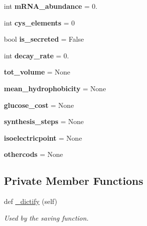 \begin{DoxyCompactItemize}
int {\bfseries m\+R\+N\+A\+\_\+abundance} = 0.
\item 
\mbox{\label{class_py_c_u_b_1_1homology_1_1homology_a5492c796d1e811df903eb6ac5e6c5873}} 
int {\bfseries cys\+\_\+elements} = 0
\item 
\mbox{\label{class_py_c_u_b_1_1homology_1_1homology_a0db815d3136df0d8057d6aa207e3a9d7}} 
bool {\bfseries is\+\_\+secreted} = False
\item 
\mbox{\label{class_py_c_u_b_1_1homology_1_1homology_a86cb7804faa6ffae20b7155897d88971}} 
int {\bfseries decay\+\_\+rate} = 0.
\item 
\mbox{\label{class_py_c_u_b_1_1homology_1_1homology_a7b73b4cd404f7432302ce682970c04c1}} 
{\bfseries tot\+\_\+volume} = None
\item 
\mbox{\label{class_py_c_u_b_1_1homology_1_1homology_a2fcdeaac4c8dcda15c2faaa26d565c2b}} 
{\bfseries mean\+\_\+hydrophobicity} = None
\item 
\mbox{\label{class_py_c_u_b_1_1homology_1_1homology_a3935ee71c6588e71ed71ca843dabb275}} 
{\bfseries glucose\+\_\+cost} = None
\item 
\mbox{\label{class_py_c_u_b_1_1homology_1_1homology_af6987d4b9223fb55cfe60e0456478b71}} 
{\bfseries synthesis\+\_\+steps} = None
\item 
\mbox{\label{class_py_c_u_b_1_1homology_1_1homology_ab3cc7d820ffac1600aea6dbc58995364}} 
{\bfseries isoelectricpoint} = None
\item 
\mbox{\label{class_py_c_u_b_1_1homology_1_1homology_a0fee75b305ed6adb93ed111cce23218a}} 
{\bfseries othercods} = None
\end{DoxyCompactItemize}
\subsection*{Private Member Functions}
\begin{DoxyCompactItemize}
\item 
def \mbox{\hyperlink{class_py_c_u_b_1_1homology_1_1homology_af7f186d30cb3469d73782da85f9d06bc}{\+\_\+dictify}} (self)
\begin{DoxyCompactList}\small\item\em Used by the saving function. \end{DoxyCompactList}\end{DoxyCompactItemize}


